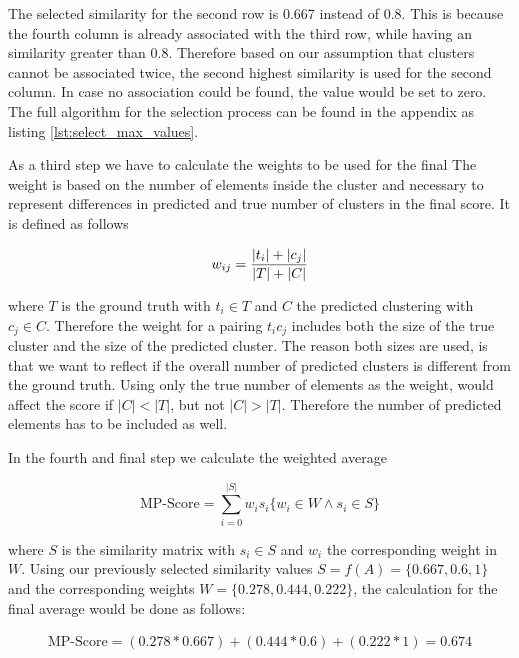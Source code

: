 The selected similarity for the second row is 0.667 instead of 0.8. This is because the fourth column is already associated with the third row, while having an similarity greater than 0.8. Therefore based on our assumption that clusters cannot be associated twice, the second highest similarity is used for the second column. In case no association could be found, the value would be set to zero. The full algorithm for the selection process can be found in the appendix as listing \ref{lst:select_max_values}.

As a third step we have to calculate the weights to be used for the final  The weight is based on the number of elements inside the cluster and necessary to represent differences in predicted and true number of clusters in the final score. It is defined as follows

\begin{equation}
    \label{equ:weight}
        w_{ij} = \frac{|t_i| + |c_j|}{|T|+|C|} \\
\end{equation}

where $T$ is the ground truth with $t_i \in T$ and $C$ the predicted clustering with  $c_j \in C$. Therefore the weight for a pairing $t_ic_j$ includes both the size of the true cluster and the size of the predicted cluster. The reason both sizes are used, is that we want to reflect if the overall number of predicted clusters is different from the ground truth. Using only the true number of elements as the weight, would affect the score if $|C| < |T|$, but not $|C| > |T|$. Therefore the number of predicted elements has to be included as well.

In the fourth and final step we calculate the weighted average

\begin{equation}
    \label{equ:weighted_average}
        \text{MP-Score} = \sum_{i=0}^{|S|} w_is_i \{w_i \in W \wedge s_i \in S\}
\end{equation}

where $S$ is the similarity matrix with $s_{i} \in S$ and $w_i$ the corresponding weight in $W$. Using our previously selected similarity values $S = f(A) = \{0.667, 0.6, 1\}$ and the corresponding weights $W = \{0.278, 0.444, 0.222\}$, the calculation for the final average would be done as follows:

\begin{align*}
    \text{MP-Score} = (0.278 * 0.667) + (0.444 * 0.6) + (0.222 * 1) = \mathbf{0.674}
\end{align*}

